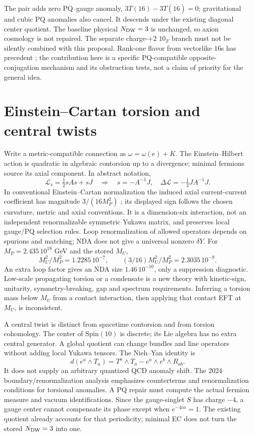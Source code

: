 \documentclass[11pt]{article}
\begin{document}
The pair adds zero PQ--gauge anomaly,
$3T(16)-3T(\overline{16})=0$; gravitational and cubic PQ anomalies
also cancel. It descends under the existing diagonal center quotient.
The baseline physical $N_{\rm DW}=3$ is unchanged, so axion cosmology
is not repaired. The separate charge-$+2$ $10_F$ branch must not be
silently combined with this proposal. Rank-one flavor from vectorlike
$16$s has precedent \cite{dmm}; the contribution here is a specific
PQ-compatible opposite-conjugation mechanism and its obstruction tests,
not a claim of priority for the general idea.

\section{Einstein--Cartan torsion and central twists}
Write a metric-compatible connection as $\omega=\omega(e)+K$.
The Einstein--Hilbert action is quadratic in algebraic contorsion
up to a divergence; minimal fermions source its axial component.
In abstract notation,
\[
\mathcal L_s=\tfrac12sAs+sJ
\quad\Longrightarrow\quad
s=-A^{-1}J,\quad \Delta\mathcal L=-\tfrac12JA^{-1}J.
\]
In conventional Einstein--Cartan normalization the induced axial
current-current coefficient has magnitude $3/(16M_P^2)$ \cite{ec};
its displayed sign follows the chosen curvature, metric and axial
conventions. It is a dimension-six interaction, not an independent
renormalizable symmetric Yukawa matrix, and preserves local gauge/PQ
selection rules. Loop renormalization of allowed operators depends on
spurions and matching; NDA does not give a universal nonzero $\delta Y$.
For $M_P=2.435\,10^{18}$ GeV and the stored $M_U$,
\[
M_U^2/M_P^2=1.2285\,10^{-7},\qquad
(3/16)M_U^2/M_P^2=2.3035\,10^{-8}.
\]
An extra loop factor gives an NDA size $1.46\,10^{-10}$, only a
suppression diagnostic. Low-scale propagating torsion or a condensate
is a new theory with kinetic-sign, unitarity, symmetry-breaking, gap
and spectrum requirements. Inferring a torsion mass below $M_U$ from
a contact interaction, then applying that contact EFT at $M_U$,
is inconsistent.

A central twist is distinct from spacetime contorsion and from torsion
cohomology. The center of $\mathrm{Spin}(10)$ is discrete; its Lie
algebra has no extra central generator. A global quotient can change
bundles and line operators without adding local Yukawa tensors.
The Nieh--Yan identity is
\[
d(e^a\wedge T_a)=T^a\wedge T_a-e^a\wedge e^b\wedge R_{ab}.
\]
It does not supply an arbitrary quantized QCD anomaly shift.
The 2024 boundary/renormalization analysis \cite{ny} emphasizes
counterterms and renormalization conditions for torsional anomalies.
A PQ repair must compute the actual fermion measure and vacuum
identifications. Since the gauge-singlet $S$ has charge $-4$, a gauge
center cannot compensate its phase except when $e^{-4i\alpha}=1$.
The existing quotient already accounts for that periodicity;
minimal EC does not turn the stored $N_{\rm DW}=3$ into one.
\end{document}
